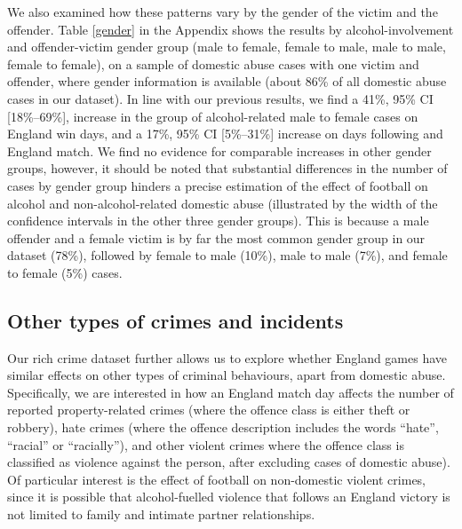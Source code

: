 \documentclass[12pt, a4paper]{article}
\begin{document}
 We also examined how these patterns vary by the gender of the victim and the offender. Table \ref{gender} in the Appendix shows the results by alcohol-involvement and offender-victim gender group (male to female, female to male, male to male, female to female), on a sample of domestic abuse cases with one victim and offender, where gender information is available (about 86\% of all domestic abuse cases in our dataset). In line with our previous results, we find a 41\%, 95\% CI [18\%--69\%], increase in the group of alcohol-related male to female cases on England win days, and a 17\%, 95\% CI [5\%--31\%] increase on days following and England match. We find no evidence for comparable increases in other gender groups, however, it should be noted that substantial differences in the number of cases by gender group hinders a precise estimation of the effect of football on alcohol and non-alcohol-related domestic abuse (illustrated by the width of the confidence intervals in the other three gender groups). This is because a male offender and a female victim is by far the most common gender group in our dataset (78\%), followed by female to male (10\%), male to male (7\%), and female to female (5\%) cases.



\subsection{Other types of crimes and incidents}


Our rich crime dataset further allows us to explore whether England games have similar effects on other types of criminal behaviours, apart from domestic abuse. Specifically, we are interested in how an England match day affects the number of reported property-related crimes (where the offence class is either theft or robbery), hate crimes (where the offence description includes the words ``hate'', ``racial'' or ``racially''), and other violent crimes where the offence class is classified as violence against the person, after excluding cases of domestic abuse). Of particular interest is the effect of football on non-domestic violent crimes, since it is possible that alcohol-fuelled violence that follows an England victory is not limited to family and intimate partner relationships. 
\end{document}
